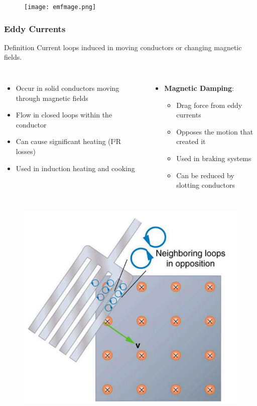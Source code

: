 \documentclass{beamer}
\begin{document}
\begin{frame}
\begin{figure}
    \centering
    \texttt{[image: emfmage.png]}
\end{figure}
\end{frame}

\begin{frame}
\frametitle{Eddy Currents}
\begin{block}{Definition}
Current loops induced in moving conductors or changing magnetic fields.
\end{block}

\begin{columns}
\begin{itemize}
\item Occur in solid conductors moving through magnetic fields
\item Flow in closed loops within the conductor
\item Can cause significant heating (I²R losses)
\item Used in induction heating and cooking
\end{itemize}

\begin{itemize}
\item \textbf{Magnetic Damping}:
\begin{itemize}
    \item Drag force from eddy currents
    \item Opposes the motion that created it
    \item Used in braking systems
    \item Can be reduced by slotting conductors
\end{itemize}
\end{itemize}
\end{columns}
\end{frame}

\begin{frame}
\begin{figure}
    \centering
    \includegraphics[width=0.5\linewidth]{eddy.png}
\end{figure}

\end{frame}
\end{document}
